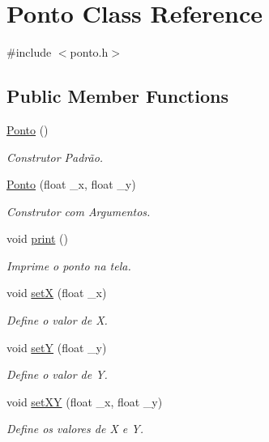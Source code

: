 \hypertarget{class_ponto}{}\section{Ponto Class Reference}
\label{class_ponto}


{\ttfamily \#include $<$ponto.\+h$>$}

\subsection*{Public Member Functions}
\begin{DoxyCompactItemize}
\item 
\mbox{\hyperlink{class_ponto_a49b03b00e9ebc01c2011c25f6517b93b}{Ponto}} ()
\begin{DoxyCompactList}\small\item\em Construtor Padrão. \end{DoxyCompactList}\item 
\mbox{\hyperlink{class_ponto_a150e330b2856e42528c4521d575f9179}{Ponto}} (float \+\_\+x, float \+\_\+y)
\begin{DoxyCompactList}\small\item\em Construtor com Argumentos. \end{DoxyCompactList}\item 
void \mbox{\hyperlink{class_ponto_a3dcee3a98a8863d4067a8de537b2a433}{print}} ()
\begin{DoxyCompactList}\small\item\em Imprime o ponto na tela. \end{DoxyCompactList}\item 
void \mbox{\hyperlink{class_ponto_a22129ad4dbf8019c479021d70a9f6774}{setX}} (float \+\_\+x)
\begin{DoxyCompactList}\small\item\em Define o valor de X. \end{DoxyCompactList}\item 
void \mbox{\hyperlink{class_ponto_a2d9e5b9fade9d3f3f21122a2dc2f5e11}{setY}} (float \+\_\+y)
\begin{DoxyCompactList}\small\item\em Define o valor de Y. \end{DoxyCompactList}\item 
void \mbox{\hyperlink{class_ponto_a827488219a7da184d440f687cec49ce6}{set\+XY}} (float \+\_\+x, float \+\_\+y)
\begin{DoxyCompactList}\small\item\em Define os valores de X e Y. \end{DoxyCompactList}\item 

\end{DoxyCompactItemize}
